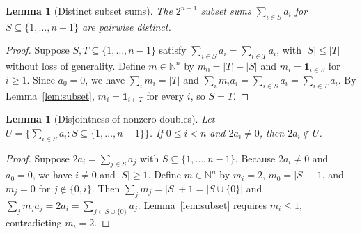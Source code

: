 \documentclass[11pt]{article}
\newtheorem{lemma}[theorem]{Lemma}
\begin{document}
\begin{lemma}[Distinct subset sums]\label{lem:distinct}
The $2^{n-1}$ subset sums $\sum_{i \in S} a_i$ for $S \subseteq \{1, \dots, n-1\}$ are pairwise distinct.
\end{lemma}
\begin{proof}
Suppose $S, T \subseteq \{1, \dots, n-1\}$ satisfy $\sum_{i \in S} a_i = \sum_{i \in T} a_i$, with $|S| \le |T|$ without loss of generality. Define $m \in \mathbb{N}^n$ by $m_0 = |T| - |S|$ and $m_i = \mathbf{1}_{i \in S}$ for $i \ge 1$. Since $a_0 = 0$, we have $\sum_i m_i = |T|$ and $\sum_i m_i a_i = \sum_{i \in S} a_i = \sum_{i \in T} a_i$. By Lemma~\ref{lem:subset}, $m_i = \mathbf{1}_{i \in T}$ for every $i$, so $S = T$.
\end{proof}

\begin{lemma}[Disjointness of nonzero doubles]\label{lem:doubles}
Let $U = \{\sum_{i \in S} a_i : S \subseteq \{1, \dots, n-1\}\}$. If $0 \le i < n$ and $2a_i \ne 0$, then $2a_i \notin U$.
\end{lemma}
\begin{proof}
Suppose $2a_i = \sum_{j \in S} a_j$ with $S \subseteq \{1, \dots, n-1\}$. Because $2a_i \ne 0$ and $a_0 = 0$, we have $i \ne 0$ and $|S| \ge 1$. Define $m \in \mathbb{N}^n$ by $m_i = 2$, $m_0 = |S| - 1$, and $m_j = 0$ for $j \notin \{0, i\}$. Then $\sum_j m_j = |S| + 1 = |S \cup \{0\}|$ and $\sum_j m_j a_j = 2a_i = \sum_{j \in S \cup \{0\}} a_j$. Lemma~\ref{lem:subset} requires $m_i \le 1$, contradicting $m_i = 2$.
\end{proof}
\end{document}

